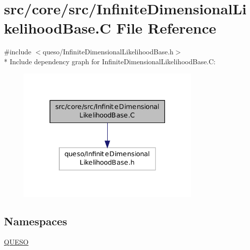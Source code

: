 \hypertarget{_infinite_dimensional_likelihood_base_8_c}{\section{src/core/src/\-Infinite\-Dimensional\-Likelihood\-Base.C File Reference}
\label{_infinite_dimensional_likelihood_base_8_c}
}
{\ttfamily \#include $<$queso/\-Infinite\-Dimensional\-Likelihood\-Base.\-h$>$}\\*
Include dependency graph for Infinite\-Dimensional\-Likelihood\-Base.\-C\-:
\nopagebreak
\begin{figure}[H]
\begin{center}
\leavevmode
\includegraphics[width=254pt]{_infinite_dimensional_likelihood_base_8_c__incl}
\end{center}
\end{figure}
\subsection*{Namespaces}
\begin{DoxyCompactItemize}
\item 
\hyperlink{namespace_q_u_e_s_o}{Q\-U\-E\-S\-O}
\end{DoxyCompactItemize}
